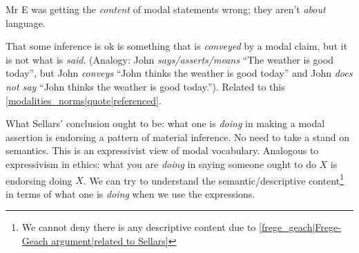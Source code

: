 Mr E was getting the \emph{content} of modal statements wrong; they aren't \emph{about} language.

That some inference is ok is something that is \emph{conveyed} by a modal claim, but it is not what is \emph{said}. (Analogy: John \emph{says/asserts/means} ``The weather is good today'', but John \emph{conveys} ``John thinks the weather is good today'' and John \emph{does not say} ``John thinks the weather is good today.''). Related to this \ref{modalities_norms|quote|referenced}.


What Sellars' conclusion ought to be: what one is \emph{doing} in making a modal assertion is endorsing a pattern of material inference. No need to take a stand on semantics. This is an expressivist view of modal vocabulary. Analogous to expressivism in ethics: what you are \emph{doing} in saying someone ought to do $X$ is endorsing doing $X$. We can try to understand the semantic/descriptive content\footnote{We cannot deny there is any descriptive content due to \ref{frege_geach|Frege-Geach argument|related to Sellars}} in terms of what one is \emph{doing} when we use the expressions.

